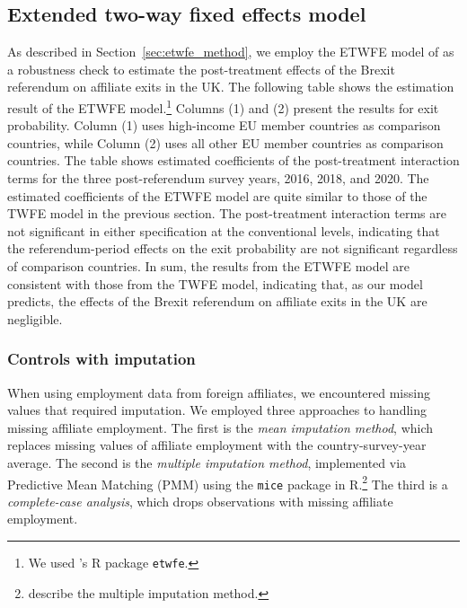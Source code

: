 \documentclass[preprint,11pt,authoryear]{elsarticle}
\begin{document}

\subsection{Extended two-way fixed effects model}\label{sec:etwfe}

As described in Section~\ref{sec:etwfe_method}, we employ the ETWFE model of \cite{wooldridge2021two} as a robustness check to estimate the post-treatment effects of the Brexit referendum on affiliate exits in the UK.
The following table shows the estimation result of the ETWFE model.\footnote{We used \cite{etwfe}'s R package \texttt{etwfe}.} 
Columns (1) and (2) present the results for exit probability.
Column (1) uses high-income EU member countries as comparison countries, while Column (2) uses all other EU member countries as comparison countries.
The table shows estimated coefficients of the post-treatment interaction terms for the three post-referendum survey years, 2016, 2018, and 2020.
The estimated coefficients of the ETWFE model are quite similar to those of the TWFE model in the previous section.
The post-treatment interaction terms are not significant in either specification at the conventional levels, indicating that the referendum-period effects on the exit probability are not significant regardless of comparison countries. 
In sum, the results from the ETWFE model are consistent with those from the TWFE model, indicating that, as our model predicts, the effects of the Brexit referendum on affiliate exits in the UK are negligible.


{\renewcommand\normalsize{\scriptsize}%
\normalsize 

}





\subsubsection*{Controls with imputation}

When using employment data from foreign affiliates, we encountered missing values that required imputation.
We employed three approaches to handling missing affiliate employment. The first is the \textit{mean imputation method}, which replaces missing values of affiliate employment with the country-survey-year average.
The second is the \textit{multiple imputation method}, implemented via Predictive Mean Matching (PMM) using the \texttt{mice} package in R.\footnote{\cite{hayati2015rise} describe the multiple imputation method.}
The third is a \textit{complete-case analysis}, which drops observations with missing affiliate employment.
\end{document}

